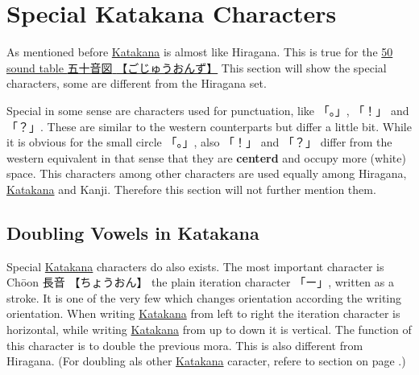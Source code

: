 \section{Special Katakana Characters}\label{sec:SpecialKatakanaCharacters}

As mentioned before \hyperref[sec:Katakana]{Katakana} is almost like Hiragana.
This is true for the \hyperref[sec:50SoundTable]{50 sound table  {五十音図}
{【ごじゅうおんず】}} This section will show the special characters, some are
different from the Hiragana set.

Special in some sense are characters used for punctuation, like {「。」},
{「！」} and {「？」}.  These are similar to the western counterparts but
differ a little bit. While it is obvious for the small circle {「。」}, also
{「！」} and {「？」} differ from the western equivalent in that sense that
they are \textbf{centerd} and occupy more (white) space. This characters among
other characters are used equally among Hiragana,
\hyperref[sec:Katakana]{Katakana} and Kanji. Therefore this section will not
further mention them.


\subsection{Doubling Vowels in Katakana}\label{subsec:DoublingVowel}


Special \hyperref[sec:Katakana]{Katakana} characters do also exists. The most
important character is Chōon {長音} {【ちょうおん】} the plain iteration
character {「ー」}, written as a stroke. It is one of the very few which
changes orientation according the writing orientation. When writing
\hyperref[sec:Katakana]{Katakana} from left to right the iteration character is
horizontal, while writing \hyperref[sec:Katakana]{Katakana} from up to down it
is vertical. The function of this character is to double the previous mora.
This is also different from Hiragana. (For doubling als other
\hyperref[sec:Katakana]{Katakana} caracter, refere to section
 on page \pageref{sec:Iteration}.)

\bigskip


